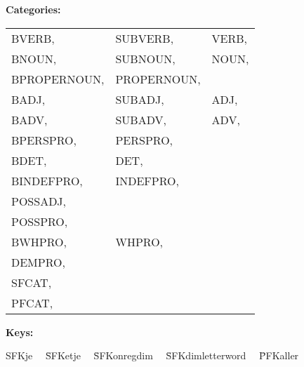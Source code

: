 {\bf Categories:}

\begin{tabular}{lll}
BVERB,       &  SUBVERB,       &  VERB,  \\
BNOUN,       &  SUBNOUN,       &  NOUN,  \\ 
BPROPERNOUN, &  PROPERNOUN,    &         \\
BADJ,        &  SUBADJ,        &  ADJ,   \\  
BADV,        &  SUBADV,        &  ADV,   \\
BPERSPRO,    &  PERSPRO,       &         \\
BDET,        &  DET,           &         \\ 
BINDEFPRO,   &  INDEFPRO,      &         \\
POSSADJ,     &                 &         \\ 
POSSPRO,     &                 &         \\ 
BWHPRO,      &  WHPRO,         &         \\
DEMPRO,      &                 &         \\
SFCAT,       &                 &         \\ 
PFCAT,       &                 &         \\ 
\end{tabular}

{\bf Keys:}

\begin{tabbing}

SFKje \ \ \= SFKetje \ \ \= SFKonregdim \ \ \= SFKdimletterword  \ \ \=  
PFKaller \\
\end{tabbing}

